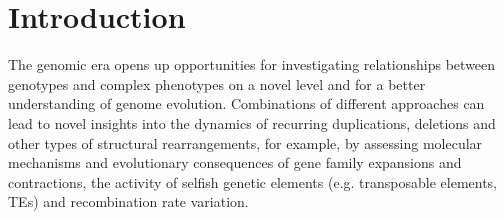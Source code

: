\documentclass[twocolumn]{bmcart}%
\begin{document}
\begin{frontmatter}
\begin{abstract}
%
\end{abstract}


\begin{keyword}
\end{keyword}


%

\end{frontmatter}



\section*{Introduction}
The genomic era opens up opportunities for investigating relationships between genotypes and complex phenotypes on a novel level and for a better understanding of genome evolution. Combinations of different approaches can lead to novel insights into the dynamics of recurring duplications, deletions and other types of structural rearrangements, for example, by assessing molecular mechanisms and evolutionary consequences of gene family expansions and contractions, the activity of selfish genetic elements (e.g. transposable elements, TEs) and recombination rate variation. 
\end{document}
